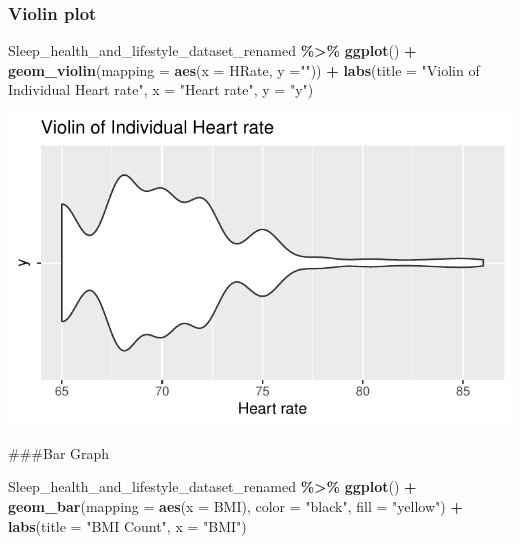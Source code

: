 \documentclass[
  11pt,
]{article}
\newenvironment{Shaded}{\begin{snugshade}}{\end{snugshade}}
\newcommand{\AttributeTok}[1]{\textcolor[rgb]{0.13,0.29,0.53}{#1}}
\newcommand{\FunctionTok}[1]{\textcolor[rgb]{0.13,0.29,0.53}{\textbf{#1}}}
\newcommand{\NormalTok}[1]{#1}
\newcommand{\SpecialCharTok}[1]{\textcolor[rgb]{0.81,0.36,0.00}{\textbf{#1}}}
\newcommand{\StringTok}[1]{\textcolor[rgb]{0.31,0.60,0.02}{#1}}
\begin{document}
\hypertarget{violin-plot}{%
\subsubsection{Violin plot}\label{violin-plot}}

\begin{Shaded}
\begin{Highlighting}[]
\NormalTok{Sleep\_health\_and\_lifestyle\_dataset\_renamed }\SpecialCharTok{\%\textgreater{}\%}
  \FunctionTok{ggplot}\NormalTok{() }\SpecialCharTok{+}
    \FunctionTok{geom\_violin}\NormalTok{(}\AttributeTok{mapping =} \FunctionTok{aes}\NormalTok{(}\AttributeTok{x =}\NormalTok{ HRate, }\AttributeTok{y =}\StringTok{""}\NormalTok{)) }\SpecialCharTok{+}
    \FunctionTok{labs}\NormalTok{(}\AttributeTok{title =} \StringTok{"Violin of Individual Heart rate"}\NormalTok{, }\AttributeTok{x =} \StringTok{"Heart rate"}\NormalTok{, }\AttributeTok{y =} \StringTok{"y"}\NormalTok{)}
\end{Highlighting}
\end{Shaded}

\begin{center}\includegraphics[width=0.7\linewidth]{SleepHelath_files/figure-latex/unnamed-chunk-41-1} \end{center}

\#\#\#Bar Graph

\begin{Shaded}
\begin{Highlighting}[]
\NormalTok{Sleep\_health\_and\_lifestyle\_dataset\_renamed }\SpecialCharTok{\%\textgreater{}\%}
  \FunctionTok{ggplot}\NormalTok{() }\SpecialCharTok{+}
    \FunctionTok{geom\_bar}\NormalTok{(}\AttributeTok{mapping =} \FunctionTok{aes}\NormalTok{(}\AttributeTok{x =}\NormalTok{ BMI), }\AttributeTok{color =} \StringTok{"black"}\NormalTok{, }\AttributeTok{fill =} \StringTok{"yellow"}\NormalTok{) }\SpecialCharTok{+}
    \FunctionTok{labs}\NormalTok{(}\AttributeTok{title =} \StringTok{"BMI Count"}\NormalTok{, }\AttributeTok{x =} \StringTok{"BMI"}\NormalTok{)}
\end{Highlighting}
\end{Shaded}
\end{document}
